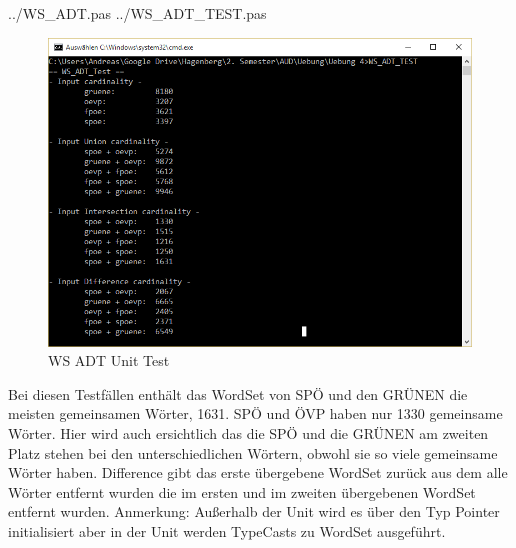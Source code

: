 \documentclass[a4papr,12pt]{article}
\begin{document}
 {../WS_ADT.pas}
 {../WS_ADT_TEST.pas}
\begin{figure}[H]
	\centering
	\includegraphics[scale=0.8]{./pictures/3.png}
	\caption{WS ADT Unit Test}
	\label{fig: Matching}
\end{figure}
\raggedright

Bei diesen Testfällen enthält das WordSet von SPÖ und den GRÜNEN die meisten gemeinsamen Wörter, 1631. SPÖ und ÖVP haben \grqq{}nur\grqq{} 1330 gemeinsame Wörter. Hier wird auch ersichtlich das die SPÖ und die GRÜNEN am zweiten Platz stehen bei den unterschiedlichen Wörtern, obwohl sie so viele gemeinsame Wörter haben. Difference gibt das erste übergebene WordSet zurück aus dem alle Wörter entfernt wurden die im ersten und im zweiten übergebenen WordSet entfernt wurden. Anmerkung: Außerhalb der Unit wird es über den Typ Pointer initialisiert aber in der Unit werden TypeCasts zu WordSet ausgeführt.
\end{document}
